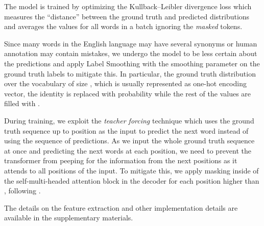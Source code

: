 \documentclass[10pt,twocolumn,letterpaper]{article}
\begin{document}
The model is trained by optimizing the Kullback--Leibler divergence loss which measures the ``distance'' between the ground truth and predicted distributions and averages the values for all words in a batch ignoring the \textit{masked} tokens. 

Since many words in the English language may have several synonyms or human annotation may contain mistakes, we undergo the model to be less certain about the predictions and apply Label Smoothing \cite{Szegedy2016} with the smoothing parameter  on the ground truth labels to mitigate this. In particular, the ground truth distribution over the vocabulary of size , which is usually represented as one-hot encoding vector, the identity is replaced with probability  while the rest of the values are filled with .

During training, we exploit the \textit{teacher forcing} technique which uses the ground truth sequence up to position  as the input to predict the next word instead of using the sequence of predictions. As we input the whole ground truth sequence at once and predicting the next words at each position, we need to prevent the transformer from peeping for the information from the next positions as it attends to all positions of the input. To mitigate this, we apply masking inside of the self-multi-headed attention block in the decoder for each position higher than , following \cite{Vaswani2017}.

The details on the feature extraction and other implementation details are available in the supplementary materials.
\end{document}
